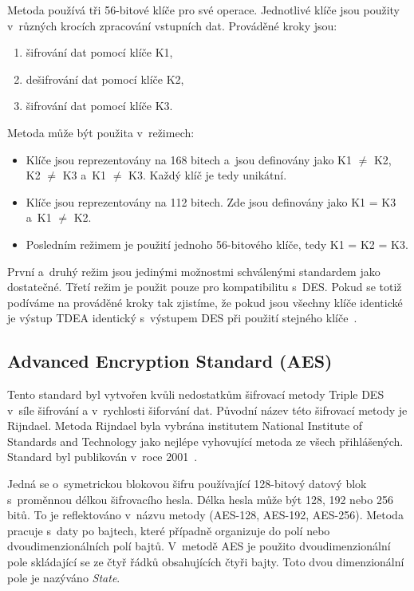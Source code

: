 Metoda používá tři 56-bitové klíče pro své operace. Jednotlivé klíče jsou použity v~různých krocích
zpracování vstupních dat. Prováděné kroky jsou:
\begin{enumerate}
    \item šifrování dat pomocí klíče K1,
    \item dešifrování dat pomocí klíče K2,
    \item šifrování dat pomocí klíče K3.
\end{enumerate}
Metoda může být použita v~režimech:
\begin{itemize}
    \item Klíče jsou reprezentovány na 168 bitech a~jsou definovány jako K1 $\neq$ K2, K2 $\neq$ K3
        a~K1 $\neq$ K3. Každý klíč je tedy unikátní.
    \item Klíče jsou reprezentovány na 112 bitech. Zde jsou definovány jako K1 = K3 a~K1 $\neq$ K2.
    \item Posledním režimem je použití jednoho 56-bitového klíče, tedy K1 = K2 = K3.
\end{itemize}
První a~druhý režim jsou jedinými možnostmi schválenými standardem jako dostatečné. Třetí režim
je použit pouze pro kompatibilitu s~DES. Pokud se totiž podíváme na prováděné kroky tak zjistíme,
že pokud jsou všechny klíče identické je výstup TDEA identický s~výstupem DES při použití stejného
klíče~\cite{NIST:2012}.

\subsection{Advanced Encryption Standard (AES)}
Tento standard byl vytvořen kvůli nedostatkům šifrovací metody Triple DES v~síle šifrování a
v~rychlosti šiforvání dat. Původní název této šifrovací metody je Rijndael. Metoda Rijndael byla
vybrána institutem National Institute of Standards and Technology jako nejlépe vyhovující metoda ze
všech přihlášených. Standard byl publikován v~roce 2001~\cite{NIST:2001}.

Jedná se o~symetrickou blokovou šifru používající 128-bitový datový blok s~proměnnou délkou
šifrovacího hesla. Délka hesla může být 128, 192 nebo 256 bitů. To je reflektováno v~názvu metody
(AES-128, AES-192, AES-256). Metoda pracuje s~daty po bajtech, které případně organizuje do polí
nebo dvoudimenzionálních polí bajtů. V~metodě AES je použito dvoudimenzionální pole skládající se
ze čtyř řádků obsahujících čtyři bajty. Toto dvou dimenzionální pole je nazýváno {\it State}.

